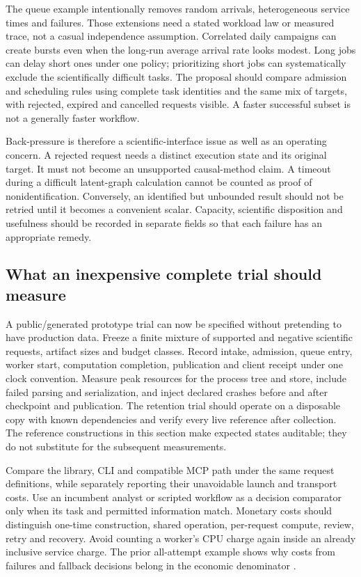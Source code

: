 The queue example intentionally removes random arrivals, heterogeneous
service times and failures. Those extensions need a stated workload law or
measured trace, not a casual independence assumption. Correlated daily
campaigns can create bursts even when the long-run average arrival rate
looks modest. Long jobs can delay short ones under one policy; prioritizing
short jobs can systematically exclude the scientifically difficult tasks.
The proposal should compare admission and scheduling rules using complete
task identities and the same mix of targets, with rejected, expired and
cancelled requests visible. A faster successful subset is not a generally
faster workflow.

Back-pressure is therefore a scientific-interface issue as well as an
operating concern. A rejected request needs a distinct execution state and
its original target. It must not become an unsupported causal-method claim.
A timeout during a difficult latent-graph calculation cannot be counted as
proof of nonidentification. Conversely, an identified but unbounded result
should not be retried until it becomes a convenient scalar. Capacity,
scientific disposition and usefulness should be recorded in separate fields
so that each failure has an appropriate remedy.

\subsection{What an inexpensive complete trial should measure}

A public/generated prototype trial can now be specified without pretending
to have production data. Freeze a finite mixture of supported and negative
scientific requests, artifact sizes and budget classes. Record intake,
admission, queue entry, worker start, computation completion, publication
and client receipt under one clock convention. Measure peak resources for
the process tree and store, include failed parsing and serialization, and
inject declared crashes before and after checkpoint and publication. The
retention trial should operate on a disposable copy with known dependencies
and verify every live reference after collection. The reference constructions
in this section make expected states auditable; they do not substitute for
the subsequent measurements.

Compare the library, CLI and compatible MCP path under the same request
definitions, while separately reporting their unavoidable launch and
transport costs. Use an incumbent analyst or scripted workflow as a
decision comparator only when its task and permitted information match.
Monetary costs should distinguish one-time construction, shared operation,
per-request compute, review, retry and recovery. Avoid counting a worker's
CPU charge again inside an already inclusive service charge. The prior
all-attempt example shows why costs from failures and fallback decisions
belong in the economic denominator \citep{exec13_ops_exact}.

